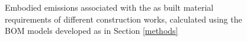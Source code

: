 \documentclass[12pt]{article}
\begin{document}
\begin{figure}[!ht]
{        }
    \caption{Embodied emissions associated with the as built material requirements of different construction works, calculated using the BOM models developed as in Section \ref{methods}}
\end{figure}
\clearpage
\end{document}
